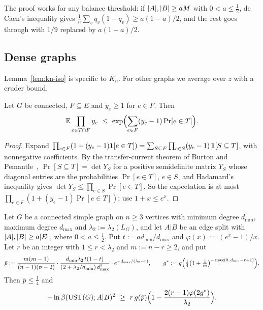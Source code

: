 The proof works for any balance threshold: if $\lvert A\rvert,\lvert B\rvert\ge aM$ with $0<a\le\frac12$, de Caen's inequality gives $\frac1n\sum_vq_v(1-q_v)\ge a(1-a)/2$, and the rest goes through with $1/9$ replaced by $a(1-a)/2$.

\subsection{Dense graphs}\label{sec:dense}

Lemma~\ref{lem:kn-iso} is specific to $K_n$. For other graphs we average over $z$ with a cruder bound.

\begin{lemma}\label{lem:forest-mgf}
Let $G$ be connected, $F\subseteq E$ and $y_e\ge1$ for $e\in F$. Then
\[
  \E\prod_{e\in T\cap F}y_e\ \le\ \exp\Bigl(\sum_{e\in F}(y_e-1)\Pr[e\in T]\Bigr).
\]
\end{lemma}

\begin{proof}
Expand $\prod_{e\in F}(1+(y_e-1)\mathbf{1}[e\in T])=\sum_{S\subseteq F}\prod_{e\in S}(y_e-1)\,\mathbf{1}[S\subseteq T]$, with nonnegative coefficients. By the transfer-current theorem of Burton and Pemantle~\cite{BurtonPemantle93}, $\Pr[S\subseteq T]=\det Y_S$ for a positive semidefinite matrix $Y_S$ whose diagonal entries are the probabilities $\Pr[e\in T]$, $e\in S$, and Hadamard's inequality gives $\det Y_S\le\prod_{e\in S}\Pr[e\in T]$. So the expectation is at most $\prod_{e\in F}(1+(y_e-1)\Pr[e\in T])$; use $1+x\le e^x$.
\end{proof}

\begin{theorem}\label{thm:dense}
Let $G$ be a connected simple graph on $n\ge3$ vertices with minimum degree $d_{\min}$, maximum degree $d_{\max}$ and $\lambda_2:=\lambda_2(L_G)$, and let $A|B$ be an edge split with $\lvert A\rvert,\lvert B\rvert\ge a\lvert E\rvert$, where $0<a\le\frac12$. Put $t:=ad_{\min}/d_{\max}$ and $\varphi(x):=(e^x-1)/x$. Let $r$ be an integer with $1\le r<\lambda_2$ and $m:=n-r\ge2$, and put
\[
  \bar p:=\frac{m(m-1)}{(n-1)(n-2)}\cdot\frac{d_{\min}\lambda_2\,t(1-t)}{(2+\lambda_2/d_{\min})\,d_{\max}^2}\cdot e^{-d_{\max}/(\lambda_2-r)},\qquad g^*:=g\Bigl(\tfrac14\bigl(1+\tfrac1m\bigr)^{-\max(0,\,d_{\min}-r+1)}\Bigr).
\]
Then $\bar p\le\frac14$ and
\[
  -\ln\beta(\UST(G);A|B)^2\ \ge\ r\,g(\bar p)\Bigl(1-\frac{2(r-1)\varphi(2g^*)}{\lambda_2}\Bigr).
\]
\end{theorem}

